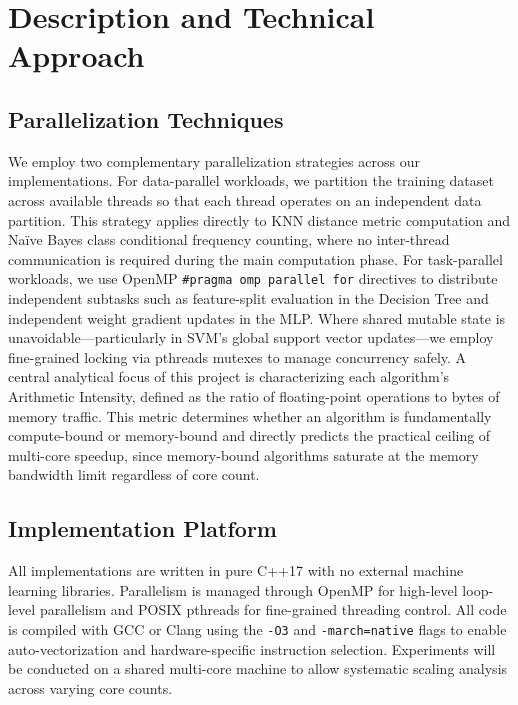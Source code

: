 \documentclass[conference]{IEEEtran}
\begin{document}
\section{Description and Technical Approach}

\subsection{Parallelization Techniques}

We employ two complementary parallelization strategies across our implementations. For data-parallel workloads, we partition the training dataset across available threads so that each thread operates on an independent data partition. This strategy applies directly to KNN distance metric computation and Naïve Bayes class conditional frequency counting, where no inter-thread communication is required during the main computation phase. For task-parallel workloads, we use OpenMP \texttt{\#pragma omp parallel for} directives to distribute independent subtasks such as feature-split evaluation in the Decision Tree and independent weight gradient updates in the MLP. Where shared mutable state is unavoidable---particularly in SVM's global support vector updates---we employ fine-grained locking via pthreads mutexes to manage concurrency safely. A central analytical focus of this project is characterizing each algorithm's Arithmetic Intensity, defined as the ratio of floating-point operations to bytes of memory traffic. This metric determines whether an algorithm is fundamentally compute-bound or memory-bound and directly predicts the practical ceiling of multi-core speedup, since memory-bound algorithms saturate at the memory bandwidth limit regardless of core count.

\subsection{Implementation Platform}

All implementations are written in pure C++17 with no external machine learning libraries. Parallelism is managed through OpenMP for high-level loop-level parallelism and POSIX pthreads for fine-grained threading control. All code is compiled with GCC or Clang using the \texttt{-O3} and \texttt{-march=native} flags to enable auto-vectorization and hardware-specific instruction selection. Experiments will be conducted on a shared multi-core machine to allow systematic scaling analysis across varying core counts.
\end{document}
